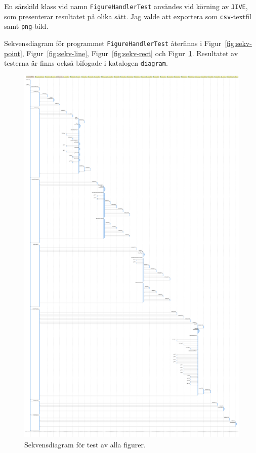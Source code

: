 En särskild klass vid namn \texttt{FigureHandlerTest} användes vid körning av
\texttt{JIVE}, som presenterar resultatet på olika sätt. Jag valde att
exportera som \texttt{csv}-textfil samt \texttt{png}-bild.

Sekvensdiagram för programmet \texttt{FigureHandlerTest} återfinns i
Figur~\ref{fig:sekv-point}, Figur~\ref{fig:sekv-line},
Figur~\ref{fig:sekv-rect} och Figur~\ref{fig:sekv-all}.
Resultatet av testerna är finns också bifogade i katalogen \texttt{diagram}.



\begin{figure}[ht]
\centering
\includegraphics[width=0.9\linewidth]{diagram/figureHandlerTest_All_Sequence-Diagram.png}
\caption{Sekvensdiagram för test av alla figurer.}
\label{fig:sekv-all}
\end{figure}


